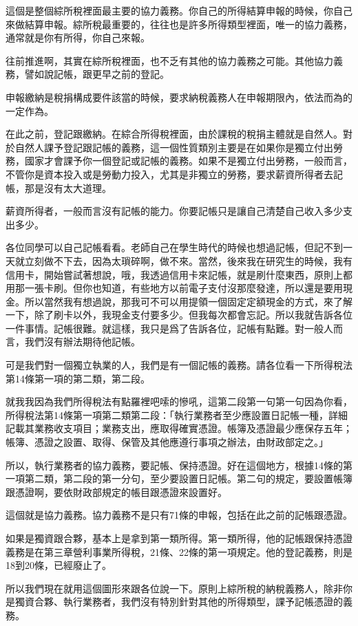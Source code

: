 \documentclass[oneside,sub3section]{ctexbook}
\begin{document}
這個是整個綜所稅裡面最主要的協力義務。你自己的所得結算申報的時候，你自己來做結算申報。綜所稅最重要的，往往也是許多所得類型裡面，唯一的協力義務，通常就是你有所得，你自己來報。

往前推進啊，其實在綜所稅裡面，也不乏有其他的協力義務之可能。其他協力義務，譬如說記帳，跟更早之前的登記。

申報繳納是稅捐構成要件該當的時候，要求納稅義務人在申報期限內，依法而為的一定作為。

在此之前，登記跟繳納。在綜合所得稅裡面，由於課稅的稅捐主體就是自然人。對於自然人課予登記跟記帳的義務，這一個性質類別主要是在如果你是獨立付出勞務，國家才會課予你一個登記或記帳的義務。如果不是獨立付出勞務，一般而言，不管你是資本投入或是勞動力投入，尤其是非獨立的勞務，要求薪資所得者去記帳，那是沒有太大道理。

薪資所得者，一般而言沒有記帳的能力。你要記帳只是讓自己清楚自己收入多少支出多少。

各位同學可以自己記帳看看。老師自己在學生時代的時候也想過記帳，但記不到一天就立刻做不下去，因為太瑣碎啊，做不來。當然，後來我在研究生的時候，我有信用卡，開始嘗試著想說，哦，我透過信用卡來記帳，就是刷什麼東西，原則上都用那一張卡刷。但你也知道，有些地方以前電子支付沒那麼發達，所以還是要用現金。所以當然我有想過說，那我可不可以用提領一個固定定額現金的方式，來了解一下，除了刷卡以外，我現金支付要多少。但我每次都會忘記。所以我就告訴各位一件事情。記帳很難。就這樣，我只是爲了告訴各位，記帳有點難。對一般人而言，我們沒有辦法期待他記帳。

可是我們對一個獨立執業的人，我們是有一個記帳的義務。請各位看一下所得稅法第14條第一項的第二類，第二段。

就我我因為我們所得稅法有點羅裡吧嗦的慘吼，這第二段第一句第一句因為你看，所得稅法第14條第一項第二類第二段：「執行業務者至少應設置日記帳一種，詳細記載其業務收支項目；業務支出，應取得確實憑證。帳簿及憑證最少應保存五年；帳簿、憑證之設置、取得、保管及其他應遵行事項之辦法，由財政部定之。」

所以，執行業務者的協力義務，要記帳、保持憑證。好在這個地方，根據14條的第一項第二類，第二段的第一分句，至少要設置日記帳。第二句的規定，要設置帳簿跟憑證啊，要依財政部規定的帳目跟憑證來設置好。

這個就是協力義務。協力義務不是只有71條的申報，包括在此之前的記帳跟憑證。

如果是獨資跟合夥，基本上是拿到第一類所得。第一類所得，他的記帳跟保持憑證義務是在第三章營利事業所得稅，21條、22條的第一項規定。他的登記義務，則是18到20條，已經廢止了。

所以我們現在就用這個圖形來跟各位說一下。原則上綜所稅的納稅義務人，除非你是獨資合夥、執行業務者，我們沒有特別針對其他的所得類型，課予記帳憑證的義務。
\end{document}
